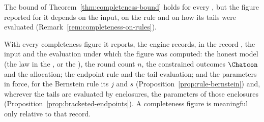 
The bound of Theorem~\ref{thm:completeness-bound} holds for every
,
but the figure reported for it depends on the input, on the rule and on how
its tails were evaluated (Remark~\ref{rem:completeness-on-rules}).

\begin{requirement}\label{req:honest-model-record}
With every completeness figure it reports, the engine records, in the record
, the input and the evaluation under which the figure was
computed: the honest model (the law in the , or the
), the round count $n$, the constrained outcomes
$\Chatcon$ and the allocation; the endpoint rule and the tail evaluation; and
the parameters in force, for the Bernstein rule its $j$ and $s$
(Proposition~\ref{prop:rule-bernstein}) and, wherever the tails are
evaluated by enclosures, the parameters of those enclosures
(Proposition~\ref{prop:bracketed-endpoints}). A completeness figure is
meaningful only relative to that record.
\end{requirement}
